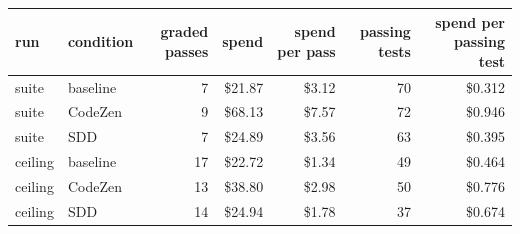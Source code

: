 
\begin{tabular}{@{}llrrrrr@{}}
\toprule
run & condition & graded passes & spend & spend per pass & passing tests & spend per passing test \\
\midrule
suite & baseline & 7 & \$21.87 & \$3.12 & 70 & \$0.312 \\
suite & CodeZen & 9 & \$68.13 & \$7.57 & 72 & \$0.946 \\
suite & SDD & 7 & \$24.89 & \$3.56 & 63 & \$0.395 \\
ceiling & baseline & 17 & \$22.72 & \$1.34 & 49 & \$0.464 \\
ceiling & CodeZen & 13 & \$38.80 & \$2.98 & 50 & \$0.776 \\
ceiling & SDD & 14 & \$24.94 & \$1.78 & 37 & \$0.674 \\
\bottomrule
\end{tabular}
